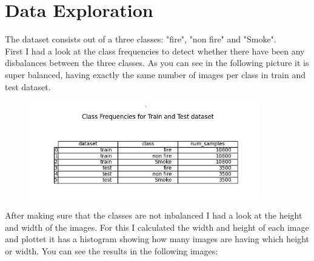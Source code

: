\documentclass[]{article}
\begin{document}
\section{Data Exploration}
The dataset consists out of a three classes: "fire", "non fire" and "Smoke".\\
First I had a look at the class frequencies to detect whether there have been any disbalances between the three classes. As you can see in the following picture it is super balanced, having exactly the same number of images per class in train and test dataset.\\
\begin{figure}[H]
	\centering
	\includegraphics[width=0.9\textwidth]{"../visualizations/data_insights/class_frequencies_original.jpg"}
	\label{fig: class frequncies in test and train dataset}
\end{figure}
After making sure that the classes are not inbalanced I had a look at the height and width of the images. For this I calculated the width and height of each image and plottet it has a histogram showing how many images are having which height or width. You can see the results in the following images:\\
\end{document}

